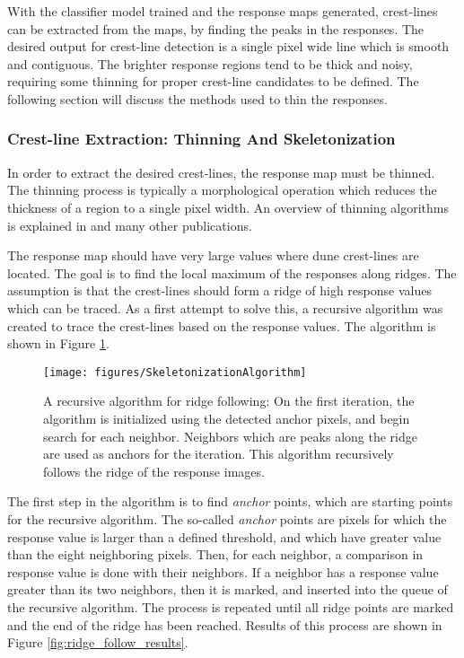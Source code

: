 With the classifier model trained and the response maps generated, crest-lines can be extracted from the maps, by finding the peaks in the responses. The desired output for crest-line detection is a single pixel wide line which is smooth and contiguous. The brighter response regions tend to be thick and noisy, requiring some thinning for proper crest-line candidates to be defined. The following section will discuss the methods used to thin the responses.

\subsubsection{Crest-line Extraction: Thinning And Skeletonization}

In order to extract the desired crest-lines, the response map must be thinned. The thinning process is typically a morphological operation which reduces the thickness of a region to a single pixel width. An overview of thinning algorithms is explained in \cite{thinning-algorithms,performance-characterization-thinning,susan-new-approach-low-level-image-processing} and many other publications.

The response map should have very large values where dune crest-lines are located. The goal is to find the local maximum of the responses along ridges. The assumption is that the crest-lines should form a ridge of high response values which can be traced. As a first attempt to solve this, a recursive algorithm was created to trace the crest-lines based on the response values. The algorithm is shown in Figure \ref{fig:recursive_ridge_follow}.

\begin{figure}
	\centering
	\texttt{[image: figures/SkeletonizationAlgorithm]}
	\caption{A recursive algorithm for ridge following: On the first iteration, the algorithm is initialized using the detected anchor pixels, and begin search for each neighbor. Neighbors which are peaks along the ridge are used as anchors for the iteration. This algorithm recursively follows the ridge of the response images.}
	\label{fig:recursive_ridge_follow}
\end{figure}

The first step in the algorithm is to find \emph{anchor} points, which are starting points for the recursive algorithm. The so-called \emph{anchor} points are pixels for which the response value is larger than a defined threshold, and which have greater value than the eight neighboring pixels. Then, for each neighbor, a comparison in response value is done with their neighbors. If a neighbor has a response value greater than its two neighbors, then it is marked, and inserted into the queue of the recursive algorithm. The process is repeated until all ridge points are marked and the end of the ridge has been reached. Results of this process are shown in Figure \ref{fig:ridge_follow_results}.

